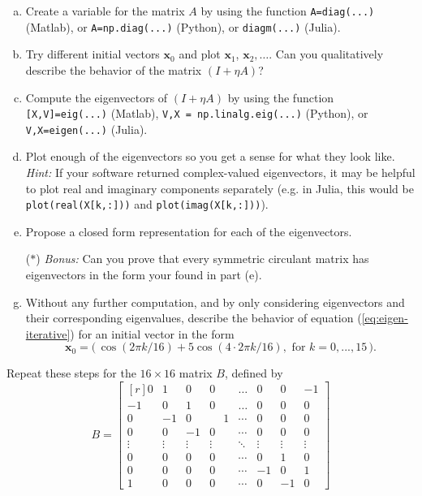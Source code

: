 \begin{enumerate}[(a)]
  \item Create a variable for the matrix $A$ by using the function \texttt{A=diag(...)} (Matlab), or \texttt{A=np.diag(...)} (Python), or \texttt{diagm(...)} (Julia).
  \item Try different initial vectors $\bm{x}_0$ and plot $\bm{x}_1$, $\bm{x}_2, \dots $. Can you qualitatively describe the behavior of the matrix $(I + \eta A)$? 
  \item Compute the eigenvectors of $(I+\eta A)$ by using the function \texttt{[X,V]=eig(...)} (Matlab), \texttt{V,X = np.linalg.eig(...)} (Python), or \texttt{V,X=eigen(...)} (Julia).
  \item \sloppy Plot enough of the eigenvectors so you get a sense for what they look like.\\ \textit{Hint:} If your software returned complex-valued eigenvectors, it may be helpful to plot real and imaginary components separately (e.g. in Julia, this would be \texttt{plot(real(X[k,:]))} and \texttt{plot(imag(X[k,:]))}). 
  \item Propose a closed form representation for each of the eigenvectors.
  \item[($\ast$)] \textit{Bonus:} Can you prove that every symmetric circulant matrix has eigenvectors in the form your found in part (e).
  \item Without any further computation, and by only considering eigenvectors and their corresponding eigenvalues, describe the behavior of equation (\ref{eq:eigen-iterative}) for an initial vector in the form
\begin{equation*}
\bm{x}_0 = \big(\, \cos(2\pi k / 16) + 5 \cos( 4 \cdot 2\pi k / 16), \text{ for } k = 0,...,15\,\big).
\end{equation*}
\end{enumerate}
Repeat these steps for the $16 \times 16$ matrix $B$, defined by
\begin{equation}
B = \begin{bmatrix*}[r] 0 & 1 & 0 & 0 & \dots & 0 & 0 & -1 \\ -1 & 0 & 1 & 0 & \dots& 0 & 0 & 0 \\ 0 & -1 & 0 & \phantom{+}1 & \cdots&0 & 0 & 0 \\ 0 & 0 & -1 & 0 & \cdots&0 & 0 & 0 \\ \vdots & \vdots & \vdots & \vdots & \ddots & \vdots & \vdots & \vdots \\ 0 & 0 & 0 & 0 & \cdots & 0 & 1 & 0 \\ 0 & 0 & 0 & 0 & \cdots & -1 & 0 & 1\\ 1 & 0 & 0 & 0 & \cdots & 0 & -1 & 0 \end{bmatrix*}
\end{equation}
